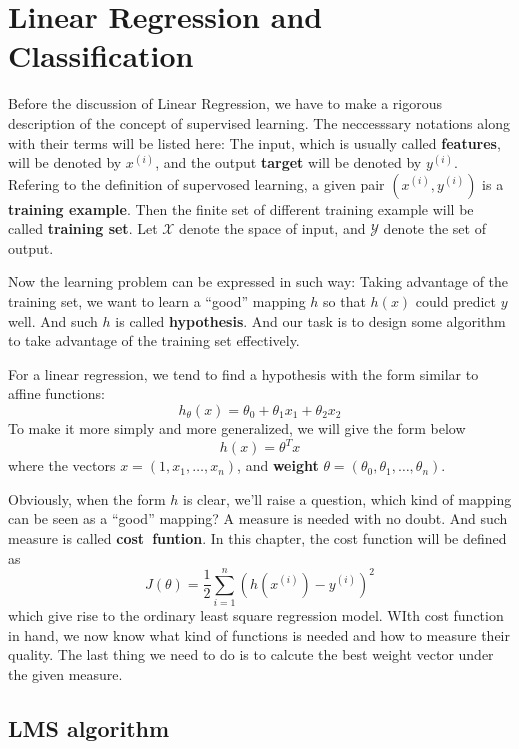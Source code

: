 \chapter{Linear Regression and Classification}

Before the discussion of Linear Regression, we have to make a rigorous description of the concept of supervised learning. The neccesssary notations along with their terms will be listed here:
The input, which is usually called \textbf{features}, will be denoted by $x^{(i)}$, and the output \textbf{target} will be denoted by $y^{(i)}$. Refering to the definition of supervosed learning,
a given pair $(x^{(i)},y^{(i)})$ is a \textbf{training example}. Then the finite set of different training example will be called \textbf{training set}. Let $\mathcal{X}$ denote the space of input,
and $\mathcal{Y}$ denote the set of output. 

Now the learning problem can be expressed in such way: Taking advantage of the training set, we want to learn a ``good'' mapping $h$ so that $h(x)$ could predict $y$ well. And such $h$ is called
\textbf{hypothesis}. And our task is to design some algorithm to take advantage of the training set effectively. 

For a linear regression, we tend to find a hypothesis with the form similar to affine functions:
\[h_\theta(x) = \theta_0+\theta_1x_1+\theta_2x_2\]
To make it more simply and more generalized, we will give the form below
\[h(x)=\theta^Tx\]
where the vectors $x = (1,x_1,\ldots,x_n)$, and \textbf{weight} $\theta = (\theta_0, \theta_1,\ldots, \theta_n)$.

Obviously, when the form $h$ is clear, we'll raise a question, which kind of mapping can be seen as a ``good'' mapping? A measure is needed with no doubt. And such measure is called \textbf{cost~funtion}.
In this chapter, the cost function will be defined as 
\[J(\theta)=\frac{1}{2}\sum_{i=1}^{n}(h(x^{(i)})-y^{(i)})^2\]
which give rise to the ordinary least square regression model. WIth cost function in hand, we now know what kind of functions is needed and how to measure their quality. The last thing we need to do is
to calcute the best weight vector under the given measure. 

\section{LMS algorithm}

